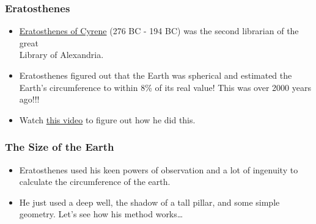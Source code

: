 \begin{frame}
\frametitle{Eratosthenes}


\begin{itemize}
\item \href{http://en.wikipedia.org/wiki/Eratosthenes}{Eratosthenes of Cyrene} (276 BC - 194 BC) was the second librarian of the great\\ Library of Alexandria.
\item Eratosthenes figured out that the Earth was spherical and estimated the Earth's circumference to within 8\% of its real value! This was over 2000 years ago!!!
\item Watch	\href{http://www.youtube.com/watch?v=8On7yCU1EjQ}{this video} to figure out how he did this.
\end{itemize}
\end{frame}

\begin{frame}
\frametitle{The Size of the Earth}
\begin{itemize}
\item Eratosthenes used his keen powers of observation and a lot of ingenuity to calculate the circumference of the earth.

\item He just used a deep well, the shadow of a tall pillar, and some simple geometry.
\newline Let's see how his method works\ldots
\end{itemize}
\medskip


\bigskip

\end{frame}

